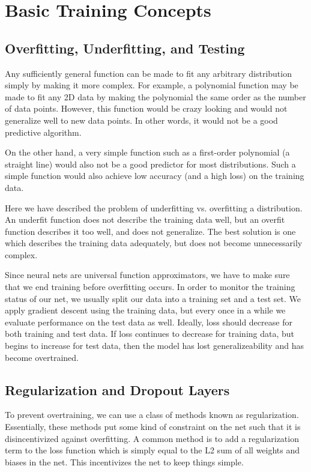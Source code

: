 \section{Basic Training Concepts}

\subsection*{Overfitting, Underfitting, and Testing}

Any sufficiently general function can be made to fit any arbitrary distribution simply by making it more complex. For example, a polynomial function may be made to fit any 2D data by making the polynomial the same order as the number of data points. However, this function would be crazy looking and would not generalize well to new data points. In other words, it would not be a good predictive algorithm.

On the other hand, a very simple function such as a first-order polynomial (a straight line) would also not be a good predictor for most distributions. Such a simple function would also achieve low accuracy (and a high loss) on the training data.

Here we have described the problem of underfitting vs. overfitting a distribution. An underfit function does not describe the training data well, but an overfit function describes it too well, and does not generalize. The best solution is one which describes the training data adequately, but does not become unnecessarily complex.

Since neural nets are universal function approximators, we have to make sure that we end training before overfitting occurs. In order to monitor the training status of our net, we usually split our data into a training set and a test set. We apply gradient descent using the training data, but every once in a while we evaluate performance on the test data as well. Ideally, loss should decrease for both training and test data. If loss continues to decrease for training data, but begins to increase for test data, then the model has lost generalizeability and has become overtrained.

\subsection*{Regularization and Dropout Layers}

To prevent overtraining, we can use a class of methods known as regularization. Essentially, these methods put some kind of constraint on the net such that it is disincentivized against overfitting. A common method is to add a regularization term to the loss function which is simply equal to the L2 sum of all weights and biases in the net. This incentivizes the net to keep things simple.

